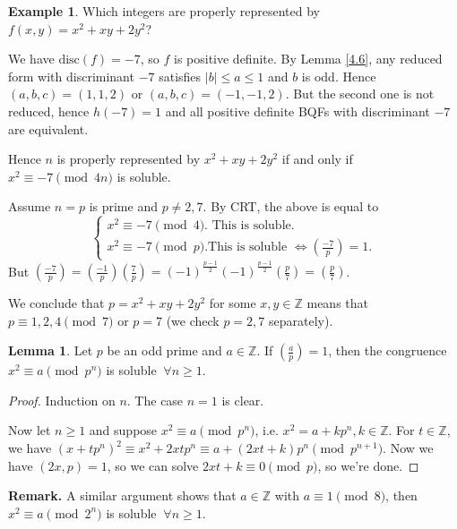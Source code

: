 \documentclass{article}
\theoremstyle{definition}
\newtheorem{lemma}[theorem]{Lemma}
\newtheorem{example}{Example}[section]
\begin{document}
\begin{example}
    Which integers are properly represented by $f(x,y)={x^2+xy+2y^2}$?
    
    We have $\text{disc}(f)=-7$, so $f$ is positive definite. By Lemma \ref{4.6}, any reduced form with discriminant $-7$ satisfies $|b|\le a \le 1$ and $b$ is odd. Hence $(a,b,c)=(1,1,2)$ or $(a,b,c) = (-1,-1,2)$. But the second one is not reduced, hence $h(-7)=1$ and all positive definite BQFs with discriminant $-7$ are equivalent.
    \vspace{1mm}
    
    Hence $n$ is properly represented by $x^2+xy+2y^2$ if and only if $x^2 \equiv -7 \pmod{4n}$ is soluble.


    Assume $n=p$ is prime and $p \neq 2,7$. By CRT, the above is equal to 
    \[
    \begin{cases}
        x^2 \equiv -7 \pmod{4}. \text{ This is soluble.} \\
        x^2 \equiv  -7 \pmod{p}. \text{This is soluble }\iff \left(\frac{-7}{p} \right) = 1. 
    \end{cases}
    \]
    But $\left(\frac{-7}{p} \right)  = \left(\frac{-1}{p}\right)\left(\frac{7}{p}\right) = (-1)^{\frac{p-1}{2}}(-1)^{\frac{p-1}{2}}\left(\frac{p}{7}\right)=\left(\frac{p}{7}\right)$.

    We conclude that $p = x^2+xy+2y^2$ for some $x,y \in \mathbb{Z}$ means that $p \equiv 1,2,4 \pmod{7}$ or $p=7$ (we check $p=2,7$ separately).
\end{example}
\begin{lemma}
    Let $p$ be an odd prime and $a \in \mathbb{Z}$. If $\left(\frac{a}{p} \right) =1$, then the congruence $x^2 \equiv a \pmod{p^n}$ is soluble $~\forall n\ge 1$.
\end{lemma}
\begin{proof}
    Induction on $n$. The case $n=1$ is clear.
    \vspace{1mm}
    
    Now let $n\ge 1$ and suppose $x^2 \equiv a \pmod{p^n}$, i.e. $x^2 = a +k p^n, k \in \mathbb{Z}$. For $t \in \mathbb{Z}$, we have $(x + tp^n)^2 \equiv x^2 + 2xt p^n \equiv a + (2xt+k)p^n \pmod{p^{n+1}}$. Now we have $(2x,p)=1$, so we can solve $2xt+k \equiv 0\pmod{p}$, so we're done.
\end{proof}
\textbf{Remark.} A similar argument shows that $a \in \mathbb{Z}$ with $a \equiv 1\pmod{8}$, then $x^2 \equiv a \pmod{2^n}$ is soluble $~\forall n\ge 1$.
\end{document}
